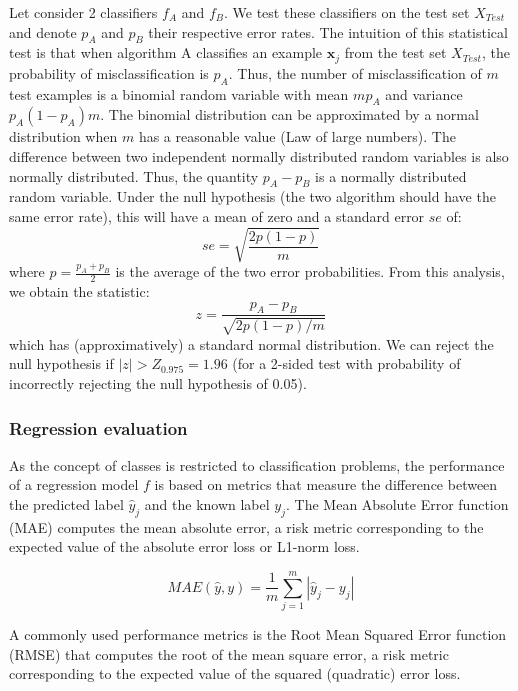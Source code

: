 Let consider 2 classifiers $f_A$ and $f_B$. We test these classifiers on the test set $X_{Test}$ and denote $p_A$ and $p_B$ their respective error rates. The intuition of this statistical test is that when algorithm A classifies an example $\textbf{x}_j$ from the test set $X_{Test}$, the probability of misclassification is $p_A$. Thus, the number of misclassification of $m$ test examples is a binomial random variable with mean $mp_A$ and variance $p_A(1-p_A)m$. The binomial distribution can be approximated by a normal distribution when $m$ has a reasonable value (Law of large numbers). The difference between two independent normally distributed random variables is also normally distributed. Thus, the quantity $p_A-p_B$ is a normally distributed random variable. Under the null hypothesis (the two algorithm should have the same error rate), this will have a mean of zero and a standard error $se$ of:
\begin{equation}
se = \sqrt{\frac{2p(1-p)}{m}}
\end{equation}
\noindent where $p=\frac{p_A+p_B}{2}$ is the average of the two error probabilities. From this analysis, we obtain the statistic:
\begin{equation}
z=\frac{p_A-p_B}{\sqrt{2p(1-p)/m}}
\end{equation}
\noindent which has (approximatively) a standard normal distribution. We can reject the null hypothesis if $|z| > Z_{0.975} = 1.96$ (for a 2-sided test with probability of incorrectly rejecting the null hypothesis of 0.05).


\subsubsection{Regression evaluation}
As the concept of classes is restricted to classification problems, the performance of a regression model $f$ is based on metrics that measure the difference between the predicted label $\hat{y}_j$ and the known label $y_j$. The Mean Absolute Error function (MAE) computes the mean absolute error, a risk metric corresponding to the expected value of the absolute error loss or L1-norm loss.

\begin{equation}
MAE(\hat{y},y) = \frac{1}{m} \sum_{j=1}^m|\hat{y}_j-y_j|
\end{equation}

A commonly used performance metrics is the Root Mean Squared Error function (RMSE) that computes the root of the mean square error, a risk metric corresponding to the expected value of the squared (quadratic) error loss.

